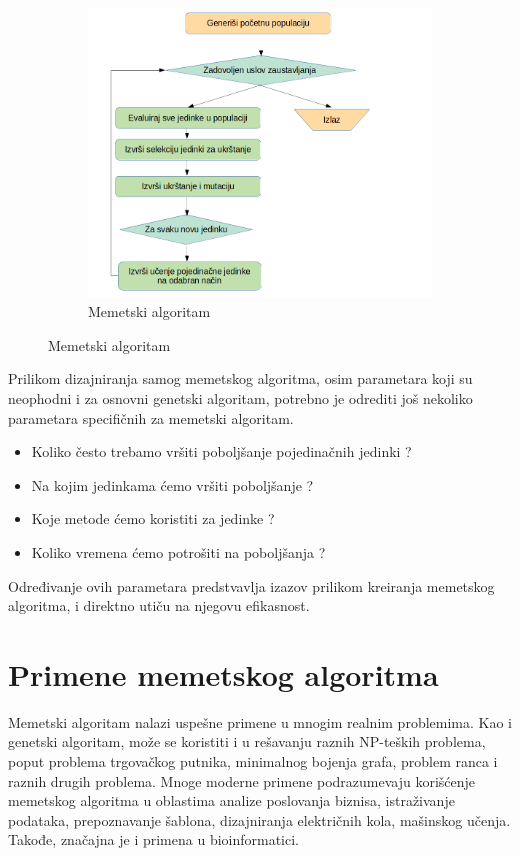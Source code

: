 \documentclass[a4paper]{article}
\begin{document}
\begin{figure}[h!]
    \centering
	\begin{subfigure}[normla]{0.3\textwidth}
		\hspace*{-1cm}\includegraphics[scale=0.3]{slike/memeticdrawcrop.png}
		\caption{Memetski algoritam}
		\label{memeticdrawcrop}
	\end{subfigure}
\label{memeticdrawcrop.png}
\end{figure}

Prilikom dizajniranja samog memetskog algoritma, osim parametara koji su neophodni i za osnovni genetski algoritam, potrebno je odrediti još nekoliko parametara specifičnih za memetski algoritam. 

\begin{itemize}
  \item Koliko često trebamo vršiti poboljšanje pojedinačnih jedinki ?
  \item Na kojim jedinkama ćemo vršiti poboljšanje ?
  \item Koje metode ćemo koristiti za jedinke ?
  \item Koliko vremena ćemo potrošiti na poboljšanja ? 
\end{itemize}

Određivanje ovih parametara predstvavlja izazov prilikom kreiranja memetskog algoritma, i direktno utiču na njegovu efikasnost. 


\section{Primene memetskog algoritma}
\label{sec:primene_memetskog_algoritma}
Memetski algoritam nalazi uspešne primene u mnogim realnim problemima. Kao i genetski algoritam, može se koristiti i u rešavanju raznih NP-teških problema, poput problema trgovačkog putnika, minimalnog bojenja grafa, problem ranca i raznih drugih problema. 
Mnoge moderne primene podrazumevaju korišćenje memetskog algoritma u oblastima analize poslovanja biznisa, istraživanje podataka, prepoznavanje šablona, dizajniranja električnih kola, mašinskog učenja. Takođe, značajna je i primena u bioinformatici. 
\end{document}

